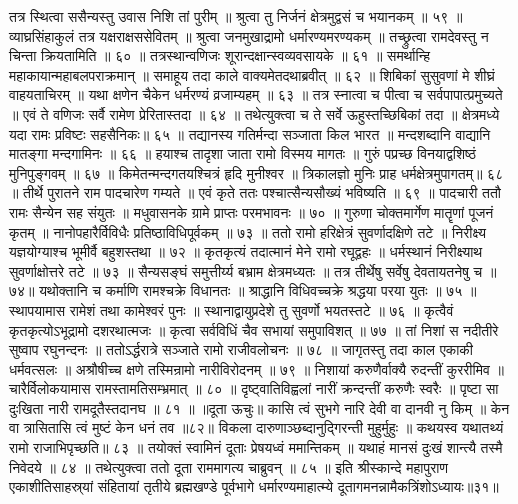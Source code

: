 तत्र स्थित्वा ससैन्यस्तु उवास निशि तां पुरीम् ॥
श्रुत्वा तु निर्जनं क्षेत्रमुद्वसं च भयानकम् ॥ ५९ ॥
व्याघ्रसिंहाकुलं तत्र यक्षराक्षससेवितम् ॥
श्रुत्वा जनमुखाद्रामो धर्मारण्यमरण्यकम् ॥
तच्छ्रुत्वा रामदेवस्तु न चिन्ता क्रियतामिति ॥ ६० ॥
तत्रस्थान्वणिजः शूरान्दक्षान्स्वव्यवसायके ॥ ६१ ॥
समर्थान्हि महाकायान्महाबलपराक्रमान् ॥
समाहूय तदा काले वाक्यमेतदथाब्रवीत् ॥ ६२ ॥
शिबिकां सुसुवणां मे शीघ्रं वाहयताचिरम् ॥
यथा क्षणेन चैकेन धर्मरण्यं व्रजाम्यहम् ॥ ६३ ॥
तत्र स्नात्वा च पीत्वा च सर्वपापात्प्रमुच्यते ॥
एवं ते वणिजः सर्वै रामेण प्रेरितास्तदा ॥ ६४ ॥
तथेत्युक्त्वा च ते सर्वे ऊहुस्तच्छिबिकां तदा ॥
क्षेत्रमध्ये यदा रामः प्रविष्टः सहसैनिकः॥ ६५ ॥
तद्यानस्य गतिर्मन्दा सञ्जाता किल भारत ॥
मन्दशब्दानि वाद्यानि मातङ्गा मन्दगामिनः ॥ ६६ ॥
हयाश्च तादृशा जाता रामो विस्मय मागतः ॥
गुरुं पप्रच्छ विनयाद्वशिष्ठं मुनिपुङ्गवम् ॥ ६७ ॥
किमेतन्मन्दगतयश्चित्रं हृदि मुनीश्वर ॥
त्रिकालज्ञो मुनिः प्राह धर्मक्षेत्रमुपागतम्॥ ६८ ॥
तीर्थे पुरातने राम पादचारेण गम्यते ॥
एवं कृते ततः पश्चात्सैन्यसौख्यं भविष्यति ॥ ६९ ॥
पादचारी ततौ रामः सैन्येन सह संयुतः ॥
मधुवासनके ग्रामे प्राप्तः परमभावनः ॥ ७० ॥
गुरुणा चोक्तमार्गेण मातॄणां पूजनं कृतम् ॥
नानोपहारैर्विविधैः प्रतिष्ठाविधिपूर्वकम् ॥ ७३ ॥
ततो रामो हरिक्षेत्रं सुवर्णादक्षिणे तटे ॥
निरीक्ष्य यज्ञयोग्याश्च भूमीर्वै बहुशस्तथा ॥ ७२ ॥
कृतकृत्यं तदात्मानं मेने रामो रघूद्वहः ॥
धर्मस्थानं निरीक्ष्याथ सुवर्णाक्षोत्तरे तटे ॥ ७३ ॥
सैन्यसङ्घं समुत्तीर्य्य बभ्राम क्षेत्रमध्यतः ॥
तत्र तीर्थेषु सर्वेषु देवतायतनेषु च ॥७४॥
यथोक्तानि च कर्माणि रामश्चक्रे विधानतः ॥
श्राद्धानि विधिवच्चक्रे श्रद्धया परया युतः ॥ ७५ ॥
स्थापयामास रामेशं तथा कामेश्वरं पुनः ॥
स्थानाद्वायुप्रदेशे तु सुवर्णो भयतस्तटे ॥ ७६ ॥
कृत्वैवं कृतकृत्योऽभूद्रामो दशरथात्मजः ॥
कृत्वा सर्वविधिं चैव सभायां समुपाविशत् ॥ ७७ ॥
तां निशां स नदीतीरे सुष्वाप रघुनन्दनः ॥
ततोऽर्द्धरात्रे सञ्जाते रामो राजीवलोचनः ॥ ७८ ॥
जागृतस्तु तदा काल एकाकी धर्मवत्सलः ॥
अश्रौषीच्च क्षणे तस्मिन्रामो नारीविरोदनम् ॥ ७९ ॥
निशायां करुणैर्वाक्यै रुदन्तीं कुररीमिव ॥
चारैर्विलोकयामास रामस्तामतिसम्भ्रमात् ॥ ८० ॥
दृष्ट्वातिविह्वलां नारीं क्रन्दन्तीं करुणैः स्वरैः ॥
पृष्टा सा दुःखिता नारी रामदूतैस्तदानघ ॥ ८१ ॥
॥दूता ऊचुः॥
कासि त्वं सुभगे नारि देवी वा दानवी नु किम् ॥
केन वा त्रासितासि त्वं मुष्टं केन धनं तव ॥८२॥
विकला दारुणाञ्छब्दानुद्गिरन्ती मुहुर्मुहुः ॥
कथयस्व यथातथ्यं रामो राजाभिपृच्छति॥ ८३ ॥
तयोक्तं स्वामिनं दूताः प्रेषयध्वं ममान्तिकम् ॥
यथाहं मानसं दुःखं शान्त्यै तस्मै निवेदये ॥ ८४ ॥
तथेत्युक्त्वा ततो दूता राममागत्य चाब्रुवन् ॥ ८५ ॥
इति श्रीस्कान्दे महापुराण एकाशीतिसाहस्र्यां संहितायां तृतीये ब्रह्मखण्डे पूर्वभागे धर्मारण्यमाहात्म्ये दूतागमनन्नामैकत्रिंशोऽध्यायः॥३१॥

